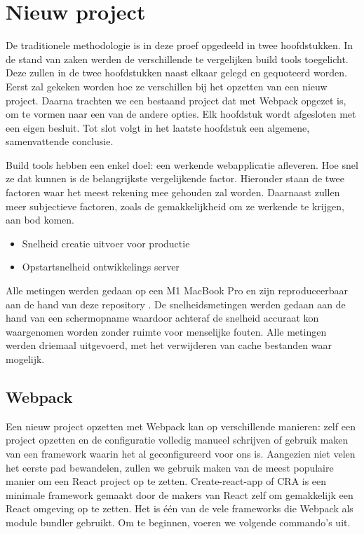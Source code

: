 \chapter{Nieuw project}

De traditionele methodologie is in deze proef opgedeeld in twee hoofdstukken. In de stand van zaken werden de verschillende te vergelijken build tools toegelicht. Deze zullen in de twee hoofdstukken naast elkaar gelegd en gequoteerd worden.
Eerst zal gekeken worden hoe ze verschillen bij het opzetten van een nieuw project. Daarna trachten we een bestaand project dat met Webpack opgezet is, om te vormen naar een van de andere opties. Elk hoofdstuk wordt afgesloten met een eigen besluit. Tot slot volgt in het laatste hoofdstuk een algemene, samenvattende conclusie.

Build tools hebben een enkel doel: een werkende webapplicatie afleveren. Hoe snel ze dat kunnen is de belangrijkste vergelijkende factor. Hieronder staan de twee factoren waar het meest rekening mee gehouden zal worden. Daarnaast zullen meer subjectieve factoren, zoals de gemakkelijkheid om ze werkende te krijgen, aan bod komen.

\begin{itemize}
   \item Snelheid creatie uitvoer voor productie
   \item Opstartsnelheid ontwikkelings server
\end{itemize}

Alle metingen werden gedaan op een M1 MacBook Pro en zijn reproduceerbaar aan de hand van deze repository \autocite{vansteenkiste-2021A}. De snelheidsmetingen werden gedaan aan de hand van een schermopname waardoor achteraf de snelheid accuraat kon waargenomen worden zonder ruimte voor menselijke fouten. Alle metingen werden driemaal uitgevoerd, met het verwijderen van cache bestanden waar mogelijk.

\section{Webpack}
Een nieuw project opzetten met Webpack kan op verschillende manieren: zelf een project opzetten en de configuratie volledig manueel schrijven of gebruik maken van een framework waarin het al geconfigureerd voor ons is. Aangezien niet velen het eerste pad bewandelen, zullen we gebruik maken van de meest populaire manier om een React project op te zetten. Create-react-app of CRA is een minimale framework gemaakt door de makers van React zelf om gemakkelijk een React omgeving op te zetten. Het is één van de vele frameworks die Webpack als module bundler gebruikt. Om te beginnen, voeren we volgende commando’s uit.

